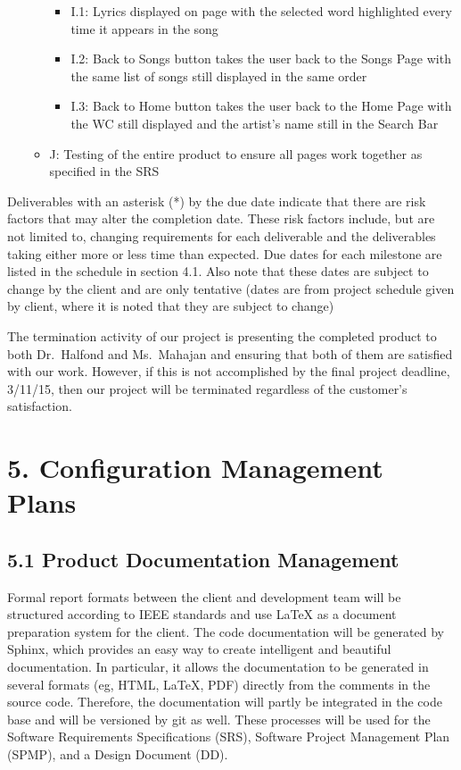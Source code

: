 \documentclass[]{article}
\begin{document}
\begin{itemize}
\begin{itemize}
    \begin{itemize}
    \itemsep1pt\parskip0pt
    \item
      I.1: Lyrics displayed on page with the selected word highlighted
      every time it appears in the song
    \item
      I.2: Back to Songs button takes the user back to the Songs Page
      with the same list of songs still displayed in the same order
    \item
      I.3: Back to Home button takes the user back to the Home Page with
      the WC still displayed and the artist's name still in the Search
      Bar
    \end{itemize}
  \item
    J: Testing of the entire product to ensure all pages work together
    as specified in the SRS
  \end{itemize}
\end{itemize}

Deliverables with an asterisk (*) by the due date indicate that there
are risk factors that may alter the completion date. These risk factors
include, but are not limited to, changing requirements for each
deliverable and the deliverables taking either more or less time than
expected. Due dates for each milestone are listed in the schedule in
section 4.1. Also note that these dates are subject to change by the
client and are only tentative (dates are from project schedule given by
client, where it is noted that they are subject to change)

The termination activity of our project is presenting the completed
product to both Dr.~Halfond and Ms.~Mahajan and ensuring that both of
them are satisfied with our work. However, if this is not accomplished
by the final project deadline, 3/11/15, then our project will be
terminated regardless of the customer's satisfaction.

\section{5. Configuration Management
Plans}\label{configuration-management-plans}

\subsection{5.1 Product Documentation
Management}\label{product-documentation-management}

Formal report formats between the client and development team will be
structured according to IEEE standards and use LaTeX as a document
preparation system for the client. The code documentation will be
generated by Sphinx, which provides an easy way to create intelligent
and beautiful documentation. In particular, it allows the documentation
to be generated in several formats (eg, HTML, LaTeX, PDF) directly from
the comments in the source code. Therefore, the documentation will
partly be integrated in the code base and will be versioned by git as
well. These processes will be used for the Software Requirements
Specifications (SRS), Software Project Management Plan (SPMP), and a
Design Document (DD).
\end{document}
